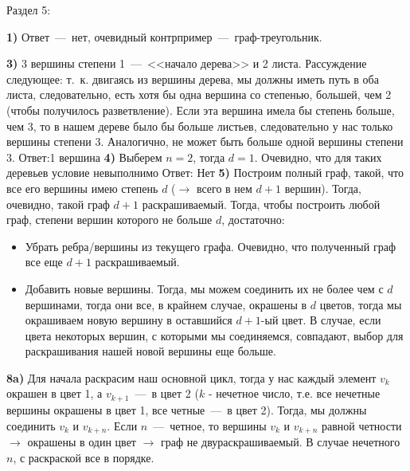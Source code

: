\documentclass[12pt,a4paper,fleqn]{article}
\begin{document}
\begin{center}
Раздел 5:
\end{center}
{\bf 1)} Ответ~---~нет, очевидный контрпример~---~граф-треугольник. \newline
{} \newline
{\bf 3)} 3 вершины степени 1~---~<<начало дерева>> и 2 листа. Рассуждение следующее: т.~к. двигаясь из вершины дерева, мы должны иметь путь в оба листа, следовательно, есть хотя бы одна вершина со степенью, большей, чем 2 (чтобы получилось разветвление). Если эта вершина имела бы степень больше, чем 3, то в нашем дереве было бы больше листьев, следовательно у нас только вершины степени 3. Аналогично, не может быть больше одной вершины степени 3. \newline
Ответ:1 вершина \newline
{\bf 4)} Выберем $n=2$, тогда $d=1$. Очевидно, что для таких деревьев условие невыполнимо \newline
Ответ: Нет \newline
{\bf 5)} Построим полный граф, такой, что все его вершины имею степень $d$ ($\rightarrow$ всего в нем $d+1$ вершин). Тогда, очевидно, такой граф $d+1$ раскрашиваемый. Тогда, чтобы построить любой граф, степени вершин которого не больше $d$, достаточно:
\begin{itemize}
\item Убрать ребра/вершины из текущего графа. Очевидно, что полученный граф все еще $d+1$ раскрашиваемый.
\item Добавить новые вершины. Тогда, мы можем соединить их не более чем с $d$ вершинами, тогда они все, в крайнем случае, окрашены в $d$ цветов, тогда мы окрашиваем новую вершину в оставшийся $d+1$-ый цвет. В случае, если цвета некоторых вершин, с которыми мы соединяемся, совпадают, выбор для раскрашивания нашей новой вершины еще больше.
\end{itemize} 
{\bf 8a)} Для начала раскрасим наш основной цикл, тогда у нас каждый элемент $v_k$ окрашен в цвет 1, а $v_{k+1}$~---~в цвет 2 ($k$ - нечетное число, т.е. все нечетные вершины окрашены в цвет 1, все четные~---~в цвет 2). Тогда, мы должны соединить $v_k$ и $v_{k+n}$. Если $n$~---~четное, то вершины $v_k$ и $v_{k+n}$ равной четности $\rightarrow$ окрашены в один цвет $\rightarrow$ граф не двураскрашиваемый. В случае нечетного $n$, с раскраской все в порядке. \newline
\end{document}
